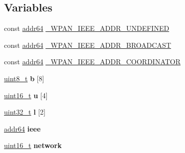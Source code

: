 \subsection*{Variables}
\begin{DoxyCompactItemize}
\item 
const \hyperlink{unionaddr64}{addr64} \hyperlink{group__wpan__types_gaaa2d876b00a2f300e24f1077e17dcb76}{\-\_\-\-W\-P\-A\-N\-\_\-\-I\-E\-E\-E\-\_\-\-A\-D\-D\-R\-\_\-\-U\-N\-D\-E\-F\-I\-N\-E\-D}
\item 
const \hyperlink{unionaddr64}{addr64} \hyperlink{group__wpan__types_ga83c0da7da25848a435da46b80fb70933}{\-\_\-\-W\-P\-A\-N\-\_\-\-I\-E\-E\-E\-\_\-\-A\-D\-D\-R\-\_\-\-B\-R\-O\-A\-D\-C\-A\-S\-T}
\item 
const \hyperlink{unionaddr64}{addr64} \hyperlink{group__wpan__types_gac6bb0830c58428d2789507a23ab9fcdd}{\-\_\-\-W\-P\-A\-N\-\_\-\-I\-E\-E\-E\-\_\-\-A\-D\-D\-R\-\_\-\-C\-O\-O\-R\-D\-I\-N\-A\-T\-O\-R}
\item 
\hypertarget{group__wpan__types_ga4892413ffe70d9782fc226d3512c6cd1}{\hyperlink{group__hal_gae1affc9ca37cfb624959c866a73f83c2}{uint8\-\_\-t} {\bfseries b} \mbox{[}8\mbox{]}}\label{group__wpan__types_ga4892413ffe70d9782fc226d3512c6cd1}

\item 
\hypertarget{group__wpan__types_ga14b257b19e277f41d86cef4c28a5a9b9}{\hyperlink{group__hal_ga5a8b2dc9e45a9ee81a94ef304fb62505}{uint16\-\_\-t} {\bfseries u} \mbox{[}4\mbox{]}}\label{group__wpan__types_ga14b257b19e277f41d86cef4c28a5a9b9}

\item 
\hypertarget{group__wpan__types_ga190ad535f282ae870446f52f11bb8e8c}{\hyperlink{group__hal__dos_ga09a1e304d66d35dd47daffee9731edaa}{uint32\-\_\-t} {\bfseries l} \mbox{[}2\mbox{]}}\label{group__wpan__types_ga190ad535f282ae870446f52f11bb8e8c}

\item 
\hypertarget{group__wpan__types_ga57d831abe873357609a3fce445ac09c0}{\hyperlink{unionaddr64}{addr64} {\bfseries ieee}}\label{group__wpan__types_ga57d831abe873357609a3fce445ac09c0}

\item 
\hypertarget{group__wpan__types_ga8389ac73067c5366c166e34801bf95c4}{\hyperlink{group__hal_ga5a8b2dc9e45a9ee81a94ef304fb62505}{uint16\-\_\-t} {\bfseries network}}\label{group__wpan__types_ga8389ac73067c5366c166e34801bf95c4}

\end{DoxyCompactItemize}
